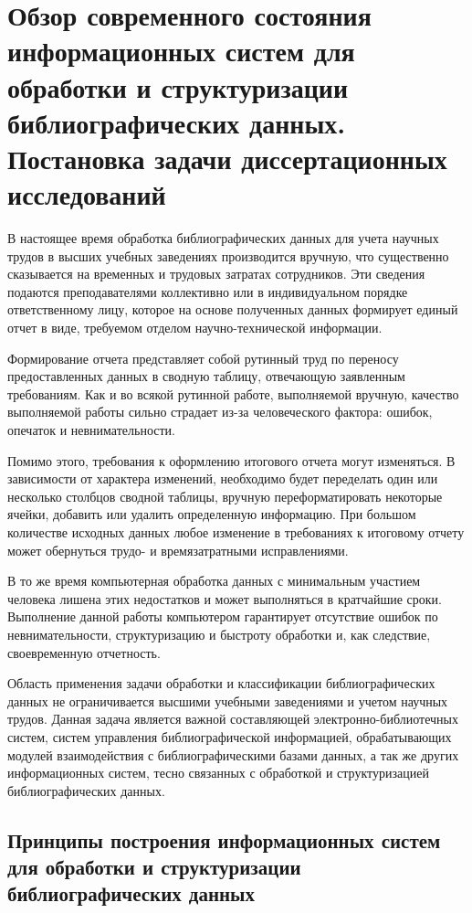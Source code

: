 \chapter{Обзор современного состояния информационных систем для обработки и структуризации библиографических данных. Постановка задачи диссертационных исследований}

В настоящее время обработка библиографических данных для учета научных трудов в высших учебных заведениях производится вручную, что существенно сказывается на временных и трудовых затратах сотрудников. Эти сведения подаются преподавателями коллективно или в индивидуальном порядке ответственному лицу, которое на основе полученных данных формирует единый отчет в виде, требуемом отделом научно-технической информации. 

Формирование отчета представляет собой рутинный труд по переносу предоставленных данных в сводную таблицу, отвечающую заявленным требованиям. Как и во всякой рутинной работе, выполняемой вручную, качество выполняемой работы сильно страдает из-за человеческого фактора: ошибок, опечаток и невнимательности.

Помимо этого, требования к оформлению итогового отчета могут изменяться. В зависимости от характера изменений, необходимо будет переделать один или несколько столбцов сводной таблицы, вручную переформатировать некоторые ячейки, добавить или удалить определенную информацию. При большом количестве исходных данных любое изменение в требованиях к итоговому отчету может обернуться трудо- и времязатратными  исправлениями.

В то же время компьютерная обработка данных с минимальным участием человека лишена этих недостатков и может выполняться в кратчайшие сроки. Выполнение данной работы компьютером гарантирует отсутствие ошибок по невнимательности, структуризацию и быстроту обработки и, как следствие, своевременную отчетность.

Область применения задачи обработки и классификации библиографических данных не ограничивается высшими учебными заведениями и учетом научных трудов. Данная задача является важной составляющей электронно-библиотечных систем, систем управления библиографической информацией, обрабатывающих модулей взаимодействия с библиографическими базами данных, а так же других информационных систем, тесно связанных с обработкой и структуризацией библиографических данных.

\section{Принципы построения информационных систем для обработки и структуризации библиографических данных}

